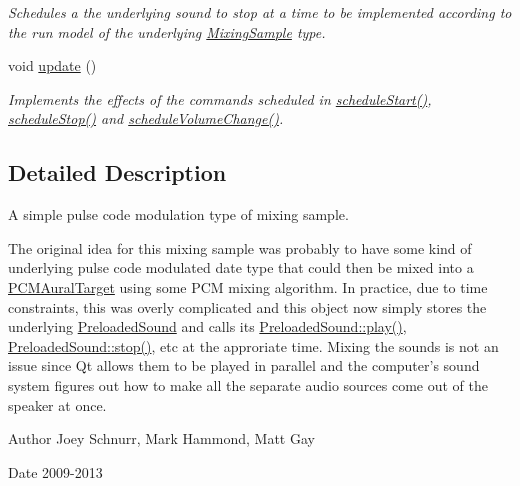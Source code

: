 \begin{DoxyCompactItemize}
\begin{DoxyCompactList}\small\item\em Schedules a the underlying sound to stop at a time to be implemented according to the run model of the underlying \hyperlink{class_picto_1_1_mixing_sample}{Mixing\-Sample} type. \end{DoxyCompactList}\item 
void \hyperlink{class_picto_1_1_p_c_m_mixing_sample_a6973973ba9ff7d6b72ee47a558df9d55}{update} ()
\begin{DoxyCompactList}\small\item\em Implements the effects of the commands scheduled in \hyperlink{class_picto_1_1_p_c_m_mixing_sample_a01bdf31cdb69f75d073ec7f74116d978}{schedule\-Start()}, \hyperlink{class_picto_1_1_p_c_m_mixing_sample_a5bbf61241bcd000a280bac4fb0970a5e}{schedule\-Stop()} and \hyperlink{class_picto_1_1_p_c_m_mixing_sample_a1876bd598742dbe7c47b5cb56758333d}{schedule\-Volume\-Change()}. \end{DoxyCompactList}\end{DoxyCompactItemize}


\subsection{Detailed Description}
A simple pulse code modulation type of mixing sample. 

The original idea for this mixing sample was probably to have some kind of underlying pulse code modulated date type that could then be mixed into a \hyperlink{class_picto_1_1_p_c_m_aural_target}{P\-C\-M\-Aural\-Target} using some P\-C\-M mixing algorithm. In practice, due to time constraints, this was overly complicated and this object now simply stores the underlying \hyperlink{class_picto_1_1_preloaded_sound}{Preloaded\-Sound} and calls its \hyperlink{class_picto_1_1_preloaded_sound_a22fb576f20b369d32f1c6b42d7d00f79}{Preloaded\-Sound\-::play()}, \hyperlink{class_picto_1_1_preloaded_sound_a876b9dd3eb966656503493a59e80554f}{Preloaded\-Sound\-::stop()}, etc at the approriate time. Mixing the sounds is not an issue since Qt allows them to be played in parallel and the computer's sound system figures out how to make all the separate audio sources come out of the speaker at once. \begin{DoxyAuthor}{Author}
Joey Schnurr, Mark Hammond, Matt Gay 
\end{DoxyAuthor}
\begin{DoxyDate}{Date}
2009-\/2013 
\end{DoxyDate}



